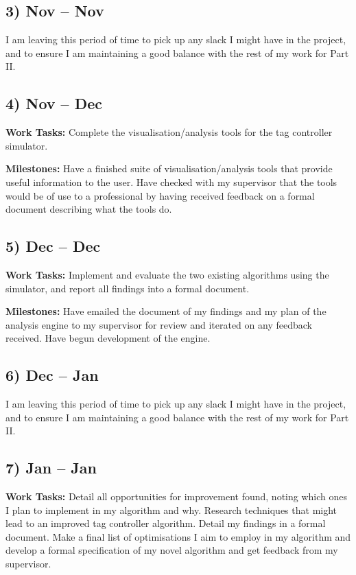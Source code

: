 \documentclass[10pt,a4paper]{article}
\begin{document}
\subsection*{3)  Nov --  Nov}
I am leaving this period of time to pick up any slack I might have in the project, and to ensure I am maintaining a good balance with the rest of my work for Part II.

\subsection*{4)  Nov --  Dec}
\textbf{Work Tasks:} Complete the visualisation/analysis tools for the tag controller simulator.

\textbf{Milestones:} Have a finished suite of visualisation/analysis tools that provide useful information to the user. Have checked with my supervisor that the tools would be of use to a professional by having received feedback on a formal document describing what the tools do.

\subsection*{5)  Dec --  Dec}
\textbf{Work Tasks:} Implement and evaluate the two existing algorithms using the simulator, and report all findings into a formal document.

\textbf{Milestones:} Have emailed the document of my findings and my plan of the analysis engine to my supervisor for review and iterated on any feedback received. Have begun development of the engine.

\subsection*{6)  Dec --  Jan}
I am leaving this period of time to pick up any slack I might have in the project, and to ensure I am maintaining a good balance with the rest of my work for Part II.

\subsection*{7)  Jan --  Jan}
\textbf{Work Tasks:} Detail all opportunities for improvement found, noting which ones I plan to implement in my algorithm and why. Research techniques that might lead to an improved tag controller algorithm. Detail my findings in a formal document. Make a final list of optimisations I aim to employ in my algorithm and develop a formal specification of my novel algorithm and get feedback from my supervisor.
\end{document}
